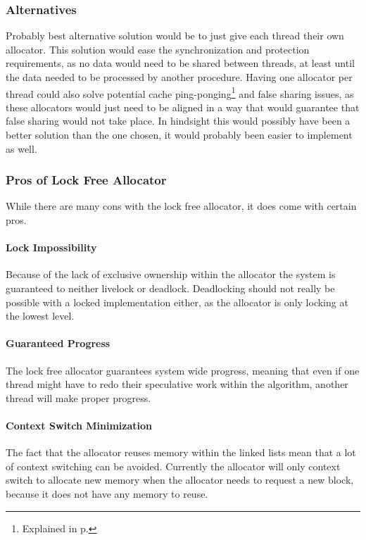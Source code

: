 \subsubsection{Alternatives}
Probably best alternative solution would be to just give each thread their own allocator.
This solution would ease the synchronization and protection requirements, as no data would need to be shared between threads,
at least until the data needed to be processed by another procedure.
Having one allocator per thread could also solve potential cache ping-ponging\footnote{Explained in p.\pageref{detailed_lock_free_ping_pong}}
and false sharing issues, as these allocators
would just need to be aligned in a way that would guarantee that false sharing would not take place.
In hindsight this would possibly have been a better solution than the one chosen, it would probably been easier to implement as well.

\subsubsection{Pros of Lock Free Allocator}
While there are many cons with the lock free allocator, it does come with certain pros.

\paragraph{Lock Impossibility}
Because of the lack of exclusive ownership within the allocator the system is guaranteed to neither livelock or deadlock.
Deadlocking should not really be possible with a locked implementation either, as the allocator is only locking at the lowest level.

\paragraph{Guaranteed Progress}
The lock free allocator guarantees system wide progress, meaning that even if one thread might have to redo their speculative work
within the algorithm, another thread will make proper progress.

\paragraph{Context Switch Minimization}
The fact that the allocator reuses memory within the linked lists mean that a lot of context switching can be avoided.
Currently the allocator will only context switch to allocate new memory when the allocator needs to request a new block,
because it does not have any memory to reuse.


